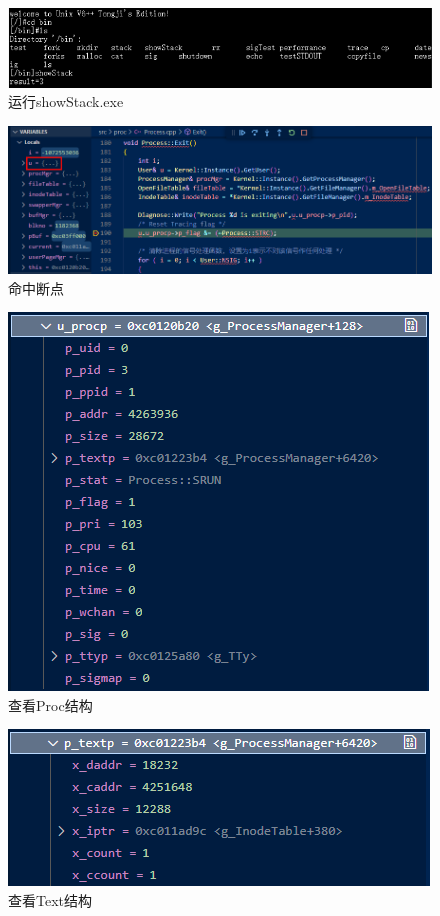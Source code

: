 \begin{figure}[!htbp]
    \centering
    \includegraphics[width=\textwidth]{figures/showStack.png}
    \caption{运行showStack.exe}\label{showStack}
\end{figure}
\begin{figure}[!htbp]
    \centering
    \includegraphics[width=\textwidth]{figures/hit.png}
    \caption{命中断点}\label{hit}
\end{figure}
\begin{figure}[!htbp]
    \centering
    \includegraphics[scale=1]{figures/u_procp.png}
    \caption{查看Proc结构}\label{proc}
\end{figure}
\begin{figure}[!htbp]
    \centering
    \includegraphics[scale=1]{figures/p_textp.png}
    \caption{查看Text结构}\label{text}
\end{figure}

